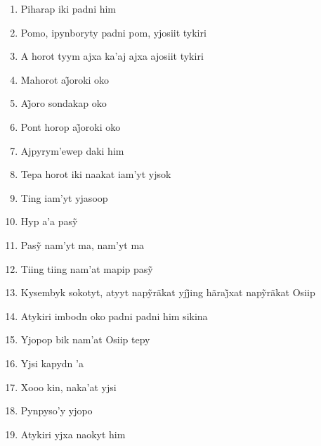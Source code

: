 \begin{enumerate}
 \item Piharap iki padni him

 \item Pomo, ipynboryty padni pom, yjosiit tykiri

 \begin{center}\end{center}

 \item A horot tyym ajxa ka'aj ajxa ajosiit tykiri

 \item Mahorot aj̃oroki oko

 \item Aj̃oro sondakap oko

 \item Pont horop aj̃oroki oko

 \item Ajpyrym'ewep daki him

 \begin{center}\end{center}

 \item Tepa horot iki naakat iam'yt yjsok

 \item Ting iam'yt yjasoop

 \item Hyp a’a pasỹ

 \item Pasỹ nam’yt ma, nam’yt ma

 \item Tiing tiing nam’at mapip pasỹ

 \begin{center}\end{center}

 \item Kysembyk sokotyt, atyyt napỹrãkat yjj̃ing hãraj̃xat napỹrãkat Osiip

 \item Atykiri imbodn oko padni padni him sikina

 \item Yjopop bik nam'at Osiip tepy

 \item Yjsi kapydn 'a

 \item Xooo kin, naka'at yjsi

 \item Pynpyso'y yjopo

 \item Atykiri yjxa naokyt him


\end{enumerate}
